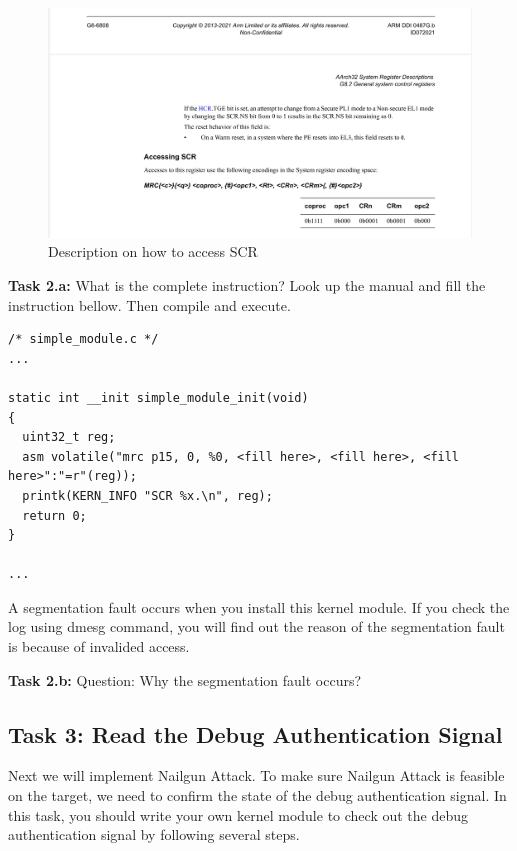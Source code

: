 \begin{figure}[h]
  \centering
  \includegraphics[scale=.50]{Accessing_SCR.png}
  \caption{Description on how to access SCR}
  \label{fig:access_scr}
\end{figure}

\textbf{Task 2.a:} What is the complete instruction? Look up the manual and fill the instruction bellow. Then compile and execute.

\begin{lstlisting}
/* simple_module.c */
...

static int __init simple_module_init(void)
{
  uint32_t reg;
  asm volatile("mrc p15, 0, %0, <fill here>, <fill here>, <fill here>":"=r"(reg));
  printk(KERN_INFO "SCR %x.\n", reg);
  return 0;
}

...
\end{lstlisting}

A segmentation fault occurs when you install this kernel module. If you check the log using dmesg command, you will find out the reason of the segmentation fault is because of invalided access. 

\textbf{Task 2.b:} Question: Why the segmentation fault occurs?

\subsection{Task 3: Read the Debug Authentication Signal}

Next we will implement Nailgun Attack. To make sure Nailgun Attack is feasible on the target, we need to confirm the state of the debug authentication signal. In this task, you should write your own kernel module to check out the debug authentication signal by following several steps.

